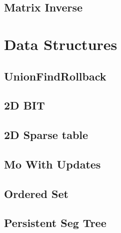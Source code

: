 \subsection{Matrix Inverse}
\vspace{-2ex}
\raggedbottom
\vspace{-3.2ex}
\hrulefill

\section{Data Structures}
\subsection{UnionFindRollback}
\vspace{-2ex}
\raggedbottom
\vspace{-3.2ex}
\hrulefill
\subsection{2D BIT}
\vspace{-2ex}
\raggedbottom
\vspace{-3.2ex}
\hrulefill
\subsection{2D Sparse table}
\vspace{-2ex}
\raggedbottom
\vspace{-3.2ex}
\hrulefill
\subsection{Mo With Updates}
\vspace{-2ex}
\raggedbottom
\vspace{-3.2ex}
\hrulefill
\subsection{Ordered Set}
\vspace{-2ex}
\raggedbottom
\vspace{-3.2ex}
\hrulefill
\subsection{Persistent Seg Tree}
\vspace{-2ex}
\raggedbottom
\vspace{-3.2ex}
\hrulefill
